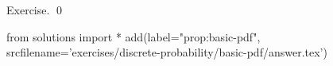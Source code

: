 
\begin{prop}
  \label{prop:basic-pdf}
  
\end{prop}
\proof
Exercise.
\qed
\begin{python0}
from solutions import *
add(label="prop:basic-pdf",
    srcfilename='exercises/discrete-probability/basic-pdf/answer.tex') 
\end{python0}
